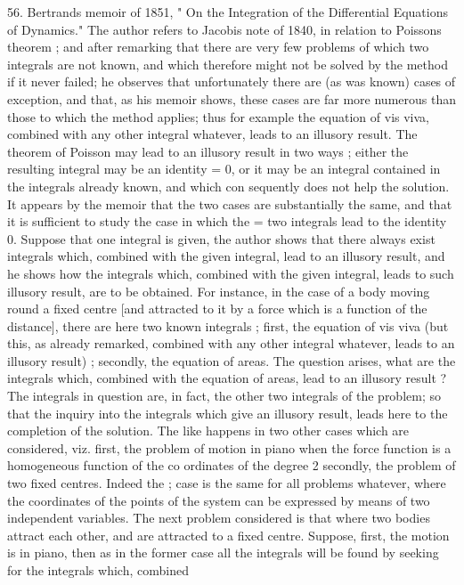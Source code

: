 \documentclass[12pt,a4paper]{article}
\theoremstyle{definition}
\begin{document}
56. Bertrands memoir of 1851, " On the Integration of the Differential Equations
of Dynamics." The author refers to Jacobis note of 1840, in relation to Poissons
theorem ; and after remarking that there are very few problems of which two integrals
are not known, and which therefore might not be solved by the method if it never
failed; he observes that unfortunately there are (as was known) cases of exception, and
that, as his memoir shows, these cases are far more numerous than those to which the
method applies; thus for example the equation of vis viva, combined with any other
integral whatever, leads to an illusory result. The theorem of Poisson may lead to
an illusory result in two ways ; either the resulting integral may be an identity = 0,
or it may be an integral contained in the integrals already known, and which con
sequently does not help the solution. It appears by the memoir that the two cases
are substantially the same, and that it is sufficient to study the case in which the
=
two integrals lead to the identity 0. Suppose that one integral is given, the
author shows that there always exist integrals which, combined with the given integral,
lead to an illusory result, and he shows how the integrals which, combined with the
given integral, leads to such illusory result, are to be obtained.
For instance, in the case of a body moving round a fixed centre [and attracted
to it by a force which is a function of the distance], there are here two known
integrals ; first, the equation of vis viva (but this, as already remarked, combined with
any other integral whatever, leads to an illusory result) ; secondly, the equation of areas.
The question arises, what are the integrals which, combined with the equation of
areas, lead to an illusory result ? The integrals in question are, in fact, the other two
integrals of the problem; so that the inquiry into the integrals which give an illusory
result, leads here to the completion of the solution.
The like happens in two other cases which are considered, viz. first, the problem
of motion in piano when the force function is a homogeneous function of the co
ordinates of the degree 2 secondly, the problem of two fixed centres. Indeed the
;
case is the same for all problems whatever, where the coordinates of the points of
the system can be expressed by means of two independent variables.
The next problem considered is that where two bodies attract each other, and are
attracted to a fixed centre. Suppose, first, the motion is in piano, then as in the
former case all the integrals will be found by seeking for the integrals which, combined
\end{document}
